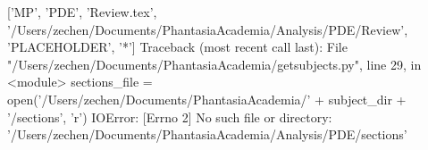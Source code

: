 ['MP', 'PDE', 'Review.tex', '/Users/zechen/Documents/PhantasiaAcademia/Analysis/PDE/Review', 'PLACEHOLDER', '*']
Traceback (most recent call last):
  File "/Users/zechen/Documents/PhantasiaAcademia/getsubjects.py", line 29, in <module>
    sections_file = open('/Users/zechen/Documents/PhantasiaAcademia/' + subject_dir + '/sections', 'r')
IOError: [Errno 2] No such file or directory: '/Users/zechen/Documents/PhantasiaAcademia/Analysis/PDE/sections'
